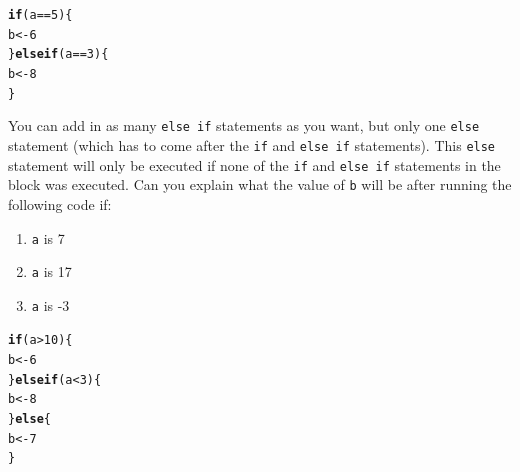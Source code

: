 \documentclass{article}\usepackage[]{graphicx}\usepackage[]{color}
\makeatletter
\newcommand{\hlnum}[1]{\textcolor[rgb]{0.686,0.059,0.569}{#1}}%
\newcommand{\hlopt}[1]{\textcolor[rgb]{0,0,0}{#1}}%
\newcommand{\hlstd}[1]{\textcolor[rgb]{0.345,0.345,0.345}{#1}}%
\newcommand{\hlkwa}[1]{\textcolor[rgb]{0.161,0.373,0.58}{\textbf{#1}}}%
\newcommand{\hlkwb}[1]{\textcolor[rgb]{0.69,0.353,0.396}{#1}}%
\newenvironment{kframe}{%
 \def\at@end@of@kframe{}%
 \ifinner\ifhmode%
  \def\at@end@of@kframe{\end{minipage}}%
  \begin{minipage}{\columnwidth}%
 \fi\fi%
 \def\FrameCommand##1{\hskip\@totalleftmargin \hskip-\fboxsep
 \colorbox{shadecolor}{##1}\hskip-\fboxsep
     \hskip-\linewidth \hskip-\@totalleftmargin \hskip\columnwidth}%
 \MakeFramed {\advance\hsize-\width
   \@totalleftmargin\z@ \linewidth\hsize
   \@setminipage}}%
 {\par\unskip\endMakeFramed%
 \at@end@of@kframe}
\newenvironment{knitrout}{}{} %
\makeatother
\begin{document}
\begin{mdframed}
\begin{knitrout}
\begin{kframe}
\begin{alltt}
\hlkwa{if}\hlstd{(a} \hlopt{==} \hlnum{5}\hlstd{)\{}
  \hlstd{b} \hlkwb{<-} \hlnum{6}
\hlstd{\}} \hlkwa{else if}\hlstd{(a} \hlopt{==} \hlnum{3}\hlstd{)\{}
  \hlstd{b} \hlkwb{<-} \hlnum{8}
\hlstd{\}}
\end{alltt}
\end{kframe}
\end{knitrout}
You can add in as many \texttt{else if} statements as you want, but only one \texttt{else} statement (which has to come after the \texttt{if} and \texttt{else if} statements). This \texttt{else} statement will only be executed if none of the \texttt{if} and \texttt{else if} statements in the block was executed. Can you explain what the value of \texttt{b} will be after running the following code if:
\begin{enumerate}
\item \texttt{a} is 7
\item \texttt{a} is 17
\item \texttt{a} is -3
\end{enumerate}
\begin{knitrout}
\color{fgcolor}\begin{kframe}
\begin{alltt}
\hlkwa{if}\hlstd{(a} \hlopt{>} \hlnum{10}\hlstd{)\{}
  \hlstd{b} \hlkwb{<-} \hlnum{6}
\hlstd{\}} \hlkwa{else if}\hlstd{(a} \hlopt{<} \hlnum{3}\hlstd{)\{}
  \hlstd{b} \hlkwb{<-} \hlnum{8}
\hlstd{\}} \hlkwa{else}\hlstd{\{}
  \hlstd{b} \hlkwb{<-} \hlnum{7}
\hlstd{\}}
\end{alltt}
\end{kframe}
\end{knitrout}
\end{mdframed}
\end{document}
